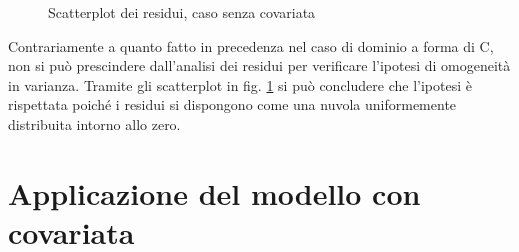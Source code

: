 \documentclass[a4paper,11pt,twoside,openright]{book}							%
\begin{document}
\begin{figure}[t]
	\centering
	\caption{Scatterplot dei residui, caso senza covariata}
	\label{fig:Ven_residui}
\end{figure}
Contrariamente a quanto fatto in precedenza nel caso di dominio a forma di C, non si può prescindere dall'analisi dei residui per verificare l'ipotesi di omogeneità in varianza. Tramite gli scatterplot in fig. \ref{fig:Ven_residui} si può concludere che l'ipotesi è rispettata poiché i residui si dispongono come una nuvola uniformemente distribuita intorno allo zero.


\section{Applicazione del modello con covariata}
\end{document}

